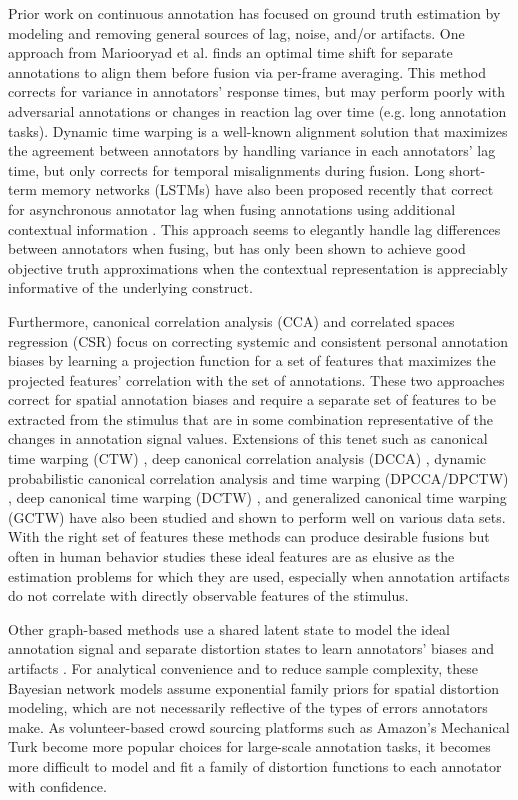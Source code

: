 \documentclass[10pt,letterpaper]{article}
\begin{document}
Prior work on continuous annotation has focused on ground truth estimation by modeling and removing general sources of lag, noise, and/or artifacts.  One approach from Mariooryad et al. \cite{Mariooryad2015} finds an optimal time shift for separate annotations to align them before fusion via per-frame averaging.  This method corrects for variance in annotators' response times, but may perform poorly with adversarial annotations or changes in reaction lag over time (e.g. long annotation tasks).  Dynamic time warping \cite{DTW2007} is a well-known alignment solution that maximizes the agreement between annotators by handling variance in each annotators' lag time, but only corrects for temporal misalignments during fusion.  Long short-term memory networks (LSTMs) have also been proposed recently that correct for asynchronous annotator lag when fusing annotations using additional contextual information \cite{Ringeval2015}.  This approach seems to elegantly handle lag differences between annotators when fusing, but has only been shown to achieve good objective truth approximations when the contextual representation is appreciably informative of the underlying construct.

Furthermore, canonical correlation analysis (CCA) \cite{CCA1936} and correlated spaces regression (CSR) \cite{nicolaou2013correlated} focus on correcting systemic and consistent personal annotation biases by learning a projection function for a set of features that maximizes the projected features' correlation with the set of annotations.  These two approaches correct for spatial annotation biases and require a separate set of features to be extracted from the stimulus that are in some combination representative of the changes in annotation signal values.  Extensions of this tenet such as canonical time warping (CTW) \cite{CTW2009}, deep canonical correlation analysis (DCCA) \cite{andrew2013deep}, dynamic probabilistic canonical correlation analysis and time warping (DPCCA/DPCTW) \cite{nicolaou2014dynamic}, deep canonical time warping (DCTW) \cite{trigeorgis2016deep}, and generalized canonical time warping (GCTW) \cite{Zhou2016} have also been studied and shown to perform well on various data sets.  With the right set of features these methods can produce desirable fusions but often in human behavior studies these ideal features are as elusive as the estimation problems for which they are used, especially when annotation artifacts do not correlate with directly observable features of the stimulus.

Other graph-based methods use a shared latent state to model the ideal annotation signal and separate distortion states to learn annotators' biases and artifacts \cite{audhkhasi2013globally, zhu2015fusing, Gupta2016}.  For analytical convenience and to reduce sample complexity, these Bayesian network models assume exponential family priors for spatial distortion modeling, which are not necessarily reflective of the types of errors annotators make.  As volunteer-based crowd sourcing platforms such as Amazon's Mechanical Turk become more popular choices for large-scale annotation tasks, it becomes more difficult to model and fit a family of distortion functions to each annotator with confidence.
\end{document}

